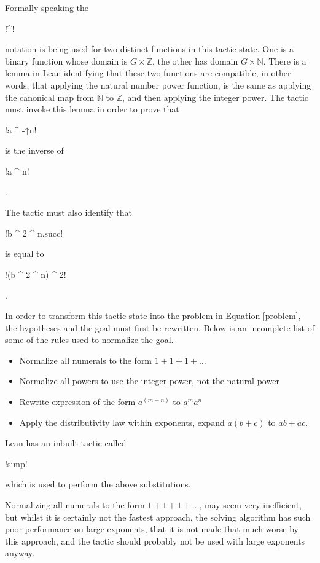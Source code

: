 \documentclass[12pt]{article} %
\theoremstyle{definition}
\theoremstyle{definition}
\theoremstyle{definition}
\theoremstyle{definition}
\theoremstyle{definition}
\theoremstyle{definition}
\begin{document}
Formally speaking the \begin{lstinline} !^! \end{lstinline} notation
is being used for two distinct functions in this tactic state. One
is a binary function whose domain is $G \times \mathbb{Z}$,
the other has domain $G \times \mathbb{N}$. There is a lemma in Lean
identifying that these two functions are compatible, in other words,
that applying the natural number power function, is the same as
applying the canonical map from $\mathbb{N}$ to $\mathbb{Z}$, and then
applying the integer power. The tactic must invoke this lemma in order to prove
that \begin{lstinline} !a ^ -↑n! \end{lstinline} is the inverse of
\begin{lstinline} !a ^ n! \end{lstinline}.

The tactic must also identify that \begin{lstinline} !b ^ 2 ^ n.succ! \end{lstinline}
is equal to \begin{lstinline} !(b ^ 2 ^ n) ^ 2! \end{lstinline}.

In order to transform this tactic state into the problem in Equation \ref{problem},
the hypotheses and the goal must first be rewritten. Below is an incomplete list of some
of the rules used to normalize the goal.

\begin{itemize}
  \item Normalize all numerals to the form
    $1 + 1 + 1 + \dots$
  \item Normalize all powers to use the integer power, not the natural power
  \item Rewrite expression of the form $a ^ (m + n)$ to $a^m a^n$
  \item Apply the distributivity law within exponents, expand
    $a(b+c)$ to $ab + ac$.
\end{itemize}

Lean has an inbuilt tactic called \begin{lstinline} !simp! \end{lstinline} which is used
to perform the above substitutions.

Normalizing all numerals to the form $1 + 1 + 1 + \dots$, may seem very inefficient,
but whilst it is certainly not the fastest approach, the
solving algorithm has such poor performance on large exponents, that it is not made
that much worse by this approach, and the tactic should probably not be used with
large exponents anyway.
\end{document}
